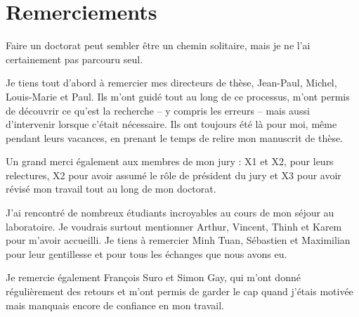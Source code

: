 



\bigskip

\begingroup
\let\clearpage\relax
\let\cleardoublepage\relax
\let\cleardoublepage\relax
\chapter*{Remerciements}

Faire un doctorat peut sembler être un chemin solitaire, mais je ne l’ai certainement pas parcouru seul.

Je tiens tout d’abord à remercier mes directeurs de thèse, Jean-Paul, Michel, Louis-Marie et Paul. Ils m’ont guidé tout au long de ce processus, m’ont permis de découvrir ce qu’est la recherche – y compris les erreurs – mais aussi d’intervenir lorsque c’était nécessaire. Ils ont toujours été là pour moi, même pendant leurs vacances, en prenant le temps de relire mon manuscrit de thèse.

Un grand merci également aux membres de mon jury : X1 et X2, pour leurs relectures, X2 pour avoir assumé le rôle de président du jury et X3 pour avoir révisé mon travail tout au long de mon doctorat.

J’ai rencontré de nombreux étudiants incroyables au cours de mon séjour au laboratoire. Je voudrais surtout mentionner Arthur, Vincent, Thinh et Karem pour m’avoir accueilli. Je tiens à remercier Minh Tuan, Sébastien et Maximilian pour leur gentillesse et pour tous les échanges que nous avons eu.

Je remercie également François Suro et Simon Gay, qui m’ont donné régulièrement des retours et m’ont permis de garder le cap quand j’étais motivée mais manquais encore de confiance en mon travail.

